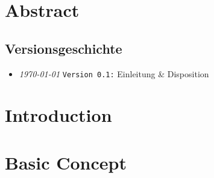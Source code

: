 \documentclass{fhnwreport/fhnwreport}
\begin{document}


\clearpage
\section*{Abstract}
\label{sec:abstract}



\clearpage
\pagestyle{empty}
{
    \renewcommand{\thispagestyle}[1]{}
    \tableofcontents
    \vspace{35mm}
    \subsection*{Versionsgeschichte}
    \begin{itemize}
        \item[]
            \emph{\today} \texttt{Version 0.1:} Einleitung \& Disposition
    \end{itemize}
}

\clearpage
\setcounter{page}{1}
\pagestyle{headings}

\clearpage
\section{Introduction}
\label{sec:introduction}


%


\clearpage
\section{Basic Concept}
\label{sec:concept}

\end{document}
